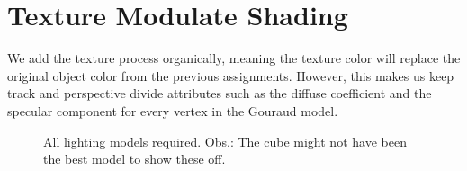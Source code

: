 \documentclass[twocolumn, 12pt]{article}
\begin{document}
\section{Texture Modulate Shading}
\label{sec:orge93d54d}

We add the texture process organically, meaning the texture color will replace
the original object color from the previous assignments. However, this makes
us keep track and perspective divide attributes such as the diffuse
coefficient and the specular component for every vertex in the Gouraud model.

\begingroup
\begin{figure}
\captionsetup[subfigure]{justification=centering}
\centering
\label{fig:lights}
\caption{All lighting models required. Obs.: The cube might not have been the best model to show these off.}
%
\hspace{0.1em}%
%
\hspace{0.1em}%
%
\end{figure}
\endgroup
\end{document}
